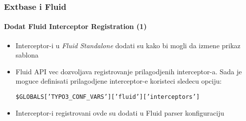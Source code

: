 \begin{frame}[fragile]
	\frametitle{Extbase i Fluid}
	\framesubtitle{Dodat Fluid Interceptor Registration (1)}

	\lstset{basicstyle=\tiny\ttfamily}

	\begin{itemize}

		\item Interceptor-i u \textit{Fluid Standalone} dodati su kako bi mogli da izmene prikaz sablona

		\item Fluid API vec dozvoljava registrovanje prilagodjenih interceptor-a.
			Sada je moguce definisati prilagodjene interceptor-e koristeci sledecu opciju:

			\small
				\texttt{\$GLOBALS['TYPO3\_CONF\_VARS']['fluid']['interceptors']}
			\normalsize

		\item Interceptor-i registrovani ovde su dodati u Fluid parser konfiguraciju

	\end{itemize}

\end{frame}

